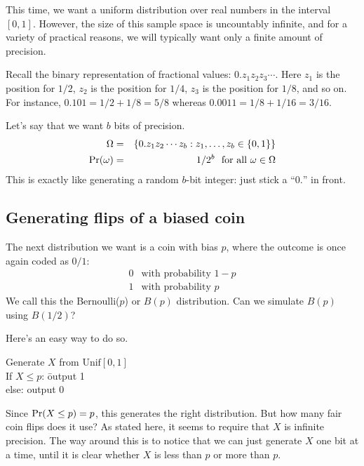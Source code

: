 This time, we want a uniform distribution over real numbers in the interval $[0,1]$.
However, the size of this sample space is uncountably infinite, and for a variety
of practical reasons, we will typically want only a finite amount of precision.

Recall the binary representation of fractional values: $0.z_1z_2z_3 \cdots$. Here
$z_1$ is the position for $1/2$, $z_2$ is the position for $1/4$, $z_3$ is the 
position for $1/8$, and so on. For instance, $0.101 = 1/2 + 1/8 = 5/8$ whereas 
$0.0011 = 1/8 + 1/16 = 3/16$.

Let's say that we want $b$ bits of precision.
\begin{eqnarray*}
\Omega & = & \{0.z_1z_2\cdots z_b: z_1, \ldots, z_b \in \{0,1\}\} \\
\mbox{\rm Pr}(\omega) & = & 1/2^b \mbox{\ \ for all $\omega \in \Omega$}
\end{eqnarray*}
This is exactly like generating a random $b$-bit integer: just stick a ``$0.$'' in front.

\subsection{Generating flips of a biased coin}

The next distribution we want is a coin with bias $p$, where the outcome is once again coded
as $0/1$:
$$ \begin{array}{ll}
    0 & \mbox{with probability $1-p$} \\
    1 & \mbox{with probability $p$}
\end{array}$$
We call this the Bernoulli($p$) or $B(p)$ distribution. Can we simulate $B(p)$ using
$B(1/2)$? 

Here's an easy way to do so.

\begin{tt}
\begin{tabbing}
Generate $X$ from $\mbox{Unif}[0,1]$ \\
If $X \leq p$: \= output 1 \\
else:          \> output 0
\end{tabbing}
\end{tt}

\noindent
Since $\mbox{\rm Pr}(X \leq p) = p$, this generates the right distribution. But how many
fair coin flips does it use? As stated here, it seems to require that $X$ is
infinite precision. The way around this is to notice that we can just generate
$X$ one bit at a time, until it is clear whether $X$ is less than $p$ or more 
than $p$.

